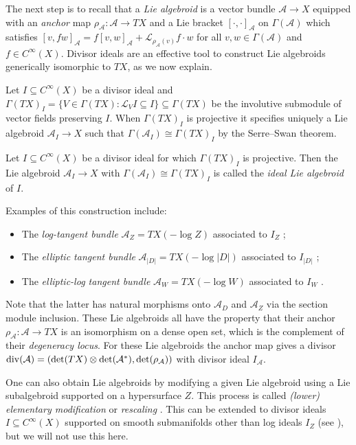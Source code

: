 \documentclass[pdftex]{sigma}
\numberwithin{equation}{section}
\begin{document}
The next step is to recall that a \emph{Lie algebroid} is a vector bundle $\mathcal{A} \to X$ equipped with an \emph{anchor} map $\rho_{\mathcal{A}}\colon \mathcal{A} \to TX$ and a Lie bracket $[\cdot,\cdot]_\mathcal{A}$ on $\Gamma(\mathcal{A})$ which satisfies $[v, f w]_\mathcal{A} = f [v,w]_\mathcal{A} + \mathcal{L}_{\rho_{\mathcal{A}}(v)} f \cdot w$ for all $v, w \in \Gamma(\mathcal{A})$ and $f \in C^\infty(X)$. Divisor ideals are an effective tool to construct Lie algebroids generically isomorphic to $TX$, as we now explain.

Let $I \subseteq C^\infty(X)$ be a divisor ideal and $\Gamma(TX)_I = \{V \in \Gamma(TX)\colon \mathcal{L}_V I \subseteq I\} \subseteq \Gamma(TX)$ be the involutive submodule of vector fields preserving $I$. When $\Gamma(TX)_I$ is projective it specifies uniquely a Lie algebroid $\mathcal{A}_I \to X$ such that $\Gamma(\mathcal{A}_I) \cong \Gamma(TX)_I$ by the Serre--Swan theorem.

\begin{Definition} Let $I \subseteq C^\infty(X)$ be a divisor ideal for which $\Gamma(TX)_I$ is projective. Then the Lie algebroid $\mathcal{A}_I \to X$ with $\Gamma(\mathcal{A}_I) \cong \Gamma(TX)_I$ is called the \emph{ideal Lie algebroid} of $I$.
\end{Definition}

Examples of this construction include:
\begin{itemize}\itemsep=0pt
\item The \emph{log-tangent bundle} $\mathcal{A}_Z = TX(-\log Z)$ associated to $I_Z$ \cite{Melrose93};
\item The \emph{elliptic tangent bundle} $\mathcal{A}_{|D|} = TX(-\log |D|)$ associated to $I_{|D|}$ \cite{CavalcantiGualtieri18};
\item The \emph{elliptic-log tangent bundle} $\mathcal{A}_W = TX(-\log W)$ associated to $I_W$ \cite{Klaasse18}.	
\end{itemize}
Note that the latter has natural morphisms onto $\mathcal{A}_D$ and $\mathcal{A}_Z$ via the section module inclusion. These Lie algebroids all have the property that their anchor $\rho_\mathcal{A}\colon \mathcal{A} \to TX$ is an isomorphism on a dense open set, which is the complement of their \emph{degeneracy locus}. For these Lie algebroids the anchor map gives a divisor ${\rm div}(\mathcal{A}) = (\det(TX) \otimes \det(\mathcal{A}^*), \det(\rho_\mathcal{A}))$ with divisor ideal $I_\mathcal{A}$.

One can also obtain Lie algebroids by modifying a given Lie algebroid using a Lie subalgebroid supported on a hypersurface $Z$. This process is called \emph{(lower) elementary modification} \cite{GualtieriLi14,Li13} or \emph{rescaling} \cite{Lanius16, Melrose93}. This can be extended to divisor ideals $I \subseteq C^\infty(X)$ supported on smooth submanifolds other than log ideals $I_Z$ (see \cite{Klaasse18}), but we will not use this here.
\end{document}
